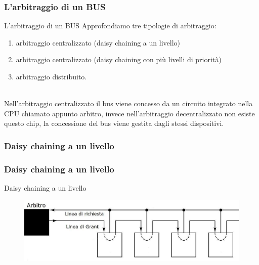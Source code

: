 \begin{frame}
	\frametitle{L'arbitraggio di un BUS}
	  
	\begin{block}{L'arbitraggio di un BUS}
		Approfondiamo tre tipologie di arbitraggio:
		\begin{enumerate}
			\item arbitraggio centralizzato (daisy chaining a un livello)
			\item arbitraggio centralizzato (daisy chaining con più livelli di priorità)
			\item arbitraggio distribuito.
		\end{enumerate}
		~\\
		Nell'arbitraggio centralizzato il bus viene concesso da un circuito integrato nella CPU chiamato appunto arbitro, invece nell'arbitraggio decentralizzato non esiste questo chip, la concessione del bus viene gestita dagli stessi dispositivi.

	\end{block}
\end{frame}



\subsubsection[Daisy chaining a un livello]{Daisy chaining a un livello}
\begin{frame}
	\frametitle{Daisy chaining a un livello}
	  
	\begin{block}{Daisy chaining a un livello}
		\begin{figure}[!htbp]
			\centering
			\includegraphics[width=0.8\linewidth]{images/6_bus/daisy_chaining_lev_1.jpg}
		\end{figure}
	\end{block}
\end{frame}


